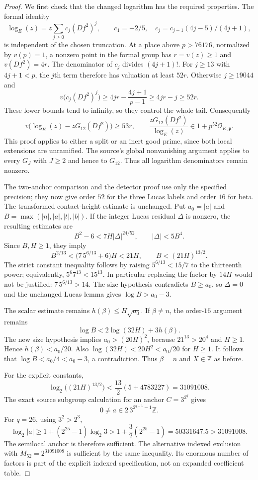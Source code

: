 \begin{proof}
We first check that the changed logarithm has the required properties.
The formal identity
\[
 \log_E(z)=z\sum_{j\ge0}c_j(Df^2)^j,
 \qquad c_1=-2/5,\quad
 c_j=c_{j-1}(4j-5)/(4j+1),
\]
is independent of the chosen truncation.  At a place above
$p>76176$, normalized by $v(p)=1$, a nonzero point in the formal
group has $r=v(z)\ge1$ and $v(Df^2)=4r$.  The denominator of $c_j$
divides $(4j+1)!$.  For $j\ge13$ with $4j+1<p$, the $j$th term
therefore has valuation at least $52r$.  Otherwise $j\ge19044$ and
\[
 v\bigl(c_j(Df^2)^j\bigr)
 \ge4jr-\frac{4j+1}{p-1}
 \ge4jr-j\ge52r.
\]
These lower bounds tend to infinity, so they control the whole tail.
Consequently
\[
 v\bigl(\log_E(z)-zG_{12}(Df^2)\bigr)\ge53r,
 \qquad
 \frac{zG_{12}(Df^2)}{\log_E(z)}\in1+p^{52}\mathcal O_{K,\mathfrak p}.
\]
This proof applies to either a split or an inert good prime, since
both local extensions are unramified.  The source's global
nonvanishing argument applies to every $G_J$ with $J\ge2$ and hence
to $G_{12}$.  Thus all logarithm denominators remain nonzero.

The two-anchor comparison and the detector proof use only the
specified precision; they now give order $52$ for the three Lucas
labels and order $16$ for beta.  The transformed contact-height
estimate is unchanged.  Put $a_0=|a|$ and
$B=\max(|n|,|a|,|t|,|b|)$.  If the integer Lucas residual
$\Delta$ is nonzero, the resulting estimates are
\[
 B^2-6<7H|\Delta|^{24/52},\qquad |\Delta|<5B^4.
\]
Since $B,H\ge1$, they imply
\[
 B^{2/13}<\bigl(7\,5^{6/13}+6\bigr)H<21H,
 \qquad B<(21H)^{13/2}.
\]
The strict constant inequality follows by raising
$5^{6/13}<15/7$ to the thirteenth power; equivalently,
$5^6 7^{13}<15^{13}$.  In particular replacing the factor by
$14H$ would not be justified: $7\,5^{6/13}>14$.
The size hypothesis contradicts $B\ge a_0$, so $\Delta=0$ and
the unchanged Lucas lemma gives $\log B>a_0-3$.

The scalar estimate remains $h(\beta)\le H\sqrt{a_0}$.
If $\beta\ne n$, the order-$16$ argument remains
\[
 \log B<2\log(32H)+3h(\beta).
\]
The new size hypothesis implies $a_0>(20H)^2$, because
$21^{13}>20^4$ and $H\ge1$.  Hence
$h(\beta)<a_0/20$.  Also
$\log(32H)<20H^2<a_0/20$ for $H\ge1$.
It follows that $\log B<a_0/4<a_0-3$, a contradiction.  Thus
$\beta=n$ and $X\in\mathbb Z$ as before.

For the explicit constants,
\[
 \log_2\bigl((21H)^{13/2}\bigr)
 <\frac{13}{2}(5+4783227)=31091008.
\]
The exact source subgroup calculation for an anchor
$C=3^{2^q}$ gives
\[
 0\ne a\in2\,3^{2^{q-1}-1}\mathbb Z.
\]
For $q=26$, using $3^2>2^3$,
\[
 \log_2|a|\ge1+(2^{25}-1)\log_2 3
 >1+\frac32(2^{25}-1)=50331647.5>31091008.
\]
The semilocal anchor is therefore sufficient.  The alternative
indexed exclusion with $M_{52}=2^{31091008}$ is sufficient by the
same inequality.  Its enormous number of factors is part of the
explicit indexed specification, not an expanded coefficient table.


\end{proof}
